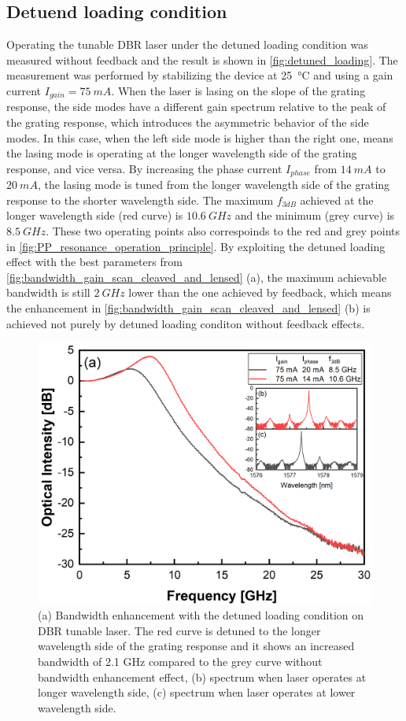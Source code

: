 \subsection{Detuend loading condition}\label{subsec:detuned_laoding_measurement}
Operating the tunable DBR laser under the detuned loading condition was measured without feedback and the result is shown in \autoref{fig:detuned_loading}. The measurement was performed by stabilizing the device at \SI{25}{\celsius} and using a gain current $I_{gain}=75 \ mA$. When the laser is lasing on the slope of the grating response, the side modes have a different gain spectrum relative to the peak of the grating response, which introduces the asymmetric behavior of the side modes. In this case, when the left side mode is higher than the right one, means the lasing mode is operating at the longer wavelength side of the grating response, and vice versa. By increasing the phase current $I_{phase}$ from $14 \ mA$ to $20 \ mA$, the lasing mode is tuned from the longer wavelength side of the grating response to the shorter wavelength side. The maximum $f_{3dB}$ achieved at the longer wavelength side (red curve) is $10.6 \ GHz$ and the minimum (grey curve) is $8.5 \ GHz$. These two operating points also correspoinds to the red and grey points in \autoref{fig:PP_resonance_operation_principle}. By exploiting the detuned loading effect with the best parameters from \autoref{fig:bandwidth_gain_scan_cleaved_and_lensed} (a), the maximum achievable bandwidth is still $2 \ GHz$ lower than the one achieved by feedback, which means the enhancement in \autoref{fig:bandwidth_gain_scan_cleaved_and_lensed} (b) is achieved not purely by detuned loading conditon without feedback effects.

\begin{figure}[ht]
    \centering
    \includegraphics[width=.6\linewidth]{figures/detuned_loading.png}
    \caption{(a) Bandwidth enhancement with the detuned loading condition on DBR tunable laser. The red curve is detuned to the longer wavelength side of the grating response and it shows an increased bandwidth of 2.1 GHz compared to the grey curve without bandwidth enhancement effect, (b) spectrum when laser operates at longer wavelength side, (c) spectrum when laser operates at lower wavelength side.}
    \label{fig:detuned_loading}
\end{figure}

